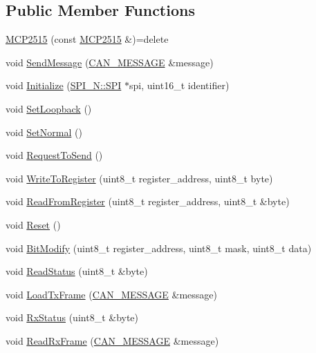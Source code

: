 \subsection*{Public Member Functions}
\begin{DoxyCompactItemize}
\item 
\hyperlink{class_m_c_p2515_a8cd4111604b740feb758bd4d077f4fb8}{M\-C\-P2515} (const \hyperlink{class_m_c_p2515}{M\-C\-P2515} \&)=delete
\item 
void \hyperlink{class_m_c_p2515_aa8c9fe944f7e6e99feb3f56a1c099a29}{Send\-Message} (\hyperlink{struct_c_a_n___m_e_s_s_a_g_e}{C\-A\-N\-\_\-\-M\-E\-S\-S\-A\-G\-E} \&message)
\item 
void \hyperlink{class_m_c_p2515_a60a93ccc1a0b21caaba5fda5f88117d2}{Initialize} (\hyperlink{class_s_p_i___n_1_1_s_p_i}{S\-P\-I\-\_\-\-N\-::\-S\-P\-I} $\ast$spi, uint16\-\_\-t identifier)
\item 
void \hyperlink{class_m_c_p2515_a7aac5fdb713b83933391348f1188f2b9}{Set\-Loopback} ()
\item 
void \hyperlink{class_m_c_p2515_a58601a9d30863ebac441d641ddfac44e}{Set\-Normal} ()
\item 
void \hyperlink{class_m_c_p2515_a5a218199ca1dfcb25cb95890bc0220fc}{Request\-To\-Send} ()
\item 
void \hyperlink{class_m_c_p2515_adbc005a5975b77b0aef74363f3832f9b}{Write\-To\-Register} (uint8\-\_\-t register\-\_\-address, uint8\-\_\-t byte)
\item 
void \hyperlink{class_m_c_p2515_a09ef6973daccbf868d89986e727cfa1b}{Read\-From\-Register} (uint8\-\_\-t register\-\_\-address, uint8\-\_\-t \&byte)
\item 
void \hyperlink{class_m_c_p2515_aa4d4138b984dc87116cf72ae104acb70}{Reset} ()
\item 
void \hyperlink{class_m_c_p2515_aa9a35fe139adf1fccaaceec561544c14}{Bit\-Modify} (uint8\-\_\-t register\-\_\-address, uint8\-\_\-t mask, uint8\-\_\-t data)
\item 
void \hyperlink{class_m_c_p2515_ae466f10eea5ccf0f36439757d4baf6b5}{Read\-Status} (uint8\-\_\-t \&byte)
\item 
void \hyperlink{class_m_c_p2515_a37771e54c401a0d11b16599f4a3b85df}{Load\-Tx\-Frame} (\hyperlink{struct_c_a_n___m_e_s_s_a_g_e}{C\-A\-N\-\_\-\-M\-E\-S\-S\-A\-G\-E} \&message)
\item 
void \hyperlink{class_m_c_p2515_af6853f82074a0be19d5a0516a959515e}{Rx\-Status} (uint8\-\_\-t \&byte)
\item 
void \hyperlink{class_m_c_p2515_a2035c6707e66a98d92003a3fc99aa784}{Read\-Rx\-Frame} (\hyperlink{struct_c_a_n___m_e_s_s_a_g_e}{C\-A\-N\-\_\-\-M\-E\-S\-S\-A\-G\-E} \&message)
\end{DoxyCompactItemize}

